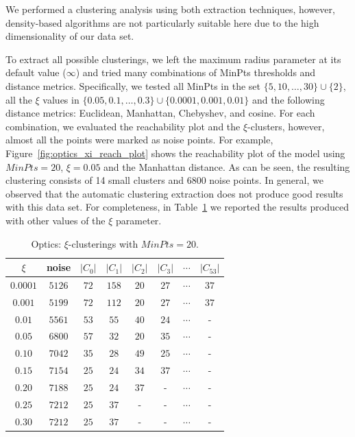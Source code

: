 \documentclass[10pt, a4paper, twocolumn]{article}
\begin{document}
We performed a clustering analysis using both extraction techniques, however, density-based algorithms are not particularly suitable here due to the high dimensionality of our data set.

To extract all possible clusterings, we left the maximum radius parameter at its default value ($\infty$) and tried many combinations of MinPts thresholds and distance metrics. Specifically, we tested all MinPts in the set $\{5, 10,\dots,30\} \cup \{2\}$, all the $\xi$ values in $\{0.05, 0.1,\dots,0.3\} \cup \{0.0001, 0.001, 0.01\}$ and the following distance metrics: Euclidean, Manhattan, Chebyshev, and cosine. For each combination, we evaluated the reachability plot and the $\xi$-clusters, however, almost all the points were marked as noise points. For example, Figure~\ref{fig:optics_xi_reach_plot} shows the reachability plot of the model using $MinPts=20$, $\xi=0.05$ and the Manhattan distance. As can be seen, the resulting clustering consists of 14 small clusters and 6800 noise points. In general, we observed that the automatic clustering extraction does not produce good results with this data set. For completeness, in Table~\ref{tab:optics_xi_clusterings} we reported the results produced with other values of the $\xi$ parameter.

\begin{table}[b]
    \centering
    \caption{Optics: $\xi$-clusterings with $MinPts=20$.}
    \begin{tabular}{cccccccc}
    \toprule
        $\xi$  & noise & $|C_0|$ & $|C_1|$ & $|C_2|$ & $|C_3|$ & $\cdots$ & $|C_{53}|$ \\
    \midrule 
        $0.0001$ & $5126$  & $72$   & $158$  & $20$   &  $27$  & $\cdots$ & $37$  \\
        $0.001$  & $5199$  & $72$   & $112$  & $20$   &  $27$  & $\cdots$ & $37$  \\ 
        $0.01$   & $5561$  & $53$   & $55$   & $40$   &  $24$  & $\cdots$ &  -    \\
        $0.05$   & $6800$  & $57$   & $32$   & $20$   &  $35$  & $\cdots$ &  -    \\
        $0.10$   & $7042$  & $35$   & $28$   & $49$   &  $25$  & $\cdots$ &  -    \\
        $0.15$   & $7154$  & $25$   & $24$   & $34$   &  $37$  & $\cdots$ &  -    \\
        $0.20$   & $7188$  & $25$   & $24$   & $37$   &  -   & $\cdots$ &  -    \\
        $0.25$   & $7212$  & $25$   & $37$   & -    &  -   & $\cdots$ &  -    \\
        $0.30$   & $7212$  & $25$   & $37$   & -    &  -   & $\cdots$ &  -    \\
    \bottomrule
    \end{tabular}
    \label{tab:optics_xi_clusterings}
\end{table}
\end{document}
